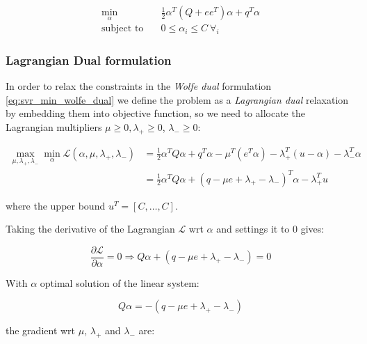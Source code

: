 \begin{equation} \label{eq:svr_min_bcqp_wolf_dual}
    \begin{aligned}
        \min_{\alpha} \quad & \frac{1}{2} \alpha^T (Q + ee^T)\alpha+q^T\alpha \\
            \text{subject to} \quad & 0\leq\alpha_i\leq C \ \forall_i
    \end{aligned}
\end{equation}

\subsubsection{Lagrangian Dual formulation}

In order to relax the constraints in the \emph{Wolfe dual} formulation \ref{eq:svr_min_wolfe_dual} we define the problem as a \emph{Lagrangian dual} relaxation by embedding them into objective function, so we need to allocate the Lagrangian multipliers $\mu \geq 0, \lambda_+ \geq 0$, $\lambda_- \geq 0$:

\begin{equation} \label{eq:svr_lagrangian_dual}
	\begin{aligned}
		    \max_{\mu,\lambda_+,\lambda_-} \min_{\alpha} \mathcal{L}(\alpha,\mu,\lambda_+,\lambda_-) &= \frac{1}{2} \alpha^T Q\alpha+q^T\alpha - \mu^T (e^T \alpha) - \lambda_+^T (u - \alpha) - \lambda_-^T \alpha \\
    &= \frac{1}{2} \alpha^T Q\alpha + (q - \mu e + \lambda_+ - \lambda_-)^T \alpha - \lambda_+^T u
	\end{aligned}
\end{equation}

where the upper bound $u^T = [C, \dots, C]$.

Taking the derivative of the Lagrangian $\mathcal{L}$ wrt $\alpha$ and settings it to 0 gives:

\begin{equation} \label{eq:svr_lagrangian_der_a}
	\frac{\partial \mathcal{L}}{\partial \alpha}=0\Rightarrow Q \alpha + (q - \mu e + \lambda_+ - \lambda_-) = 0
\end{equation}

With $\alpha$ optimal solution of the linear system:

\begin{equation} \label{eq:svr_lagrangian_sol}
    Q \alpha = - (q - \mu e + \lambda_+ - \lambda_-)
\end{equation}

the gradient wrt $\mu$, $\lambda_+$ and $\lambda_-$ are:

